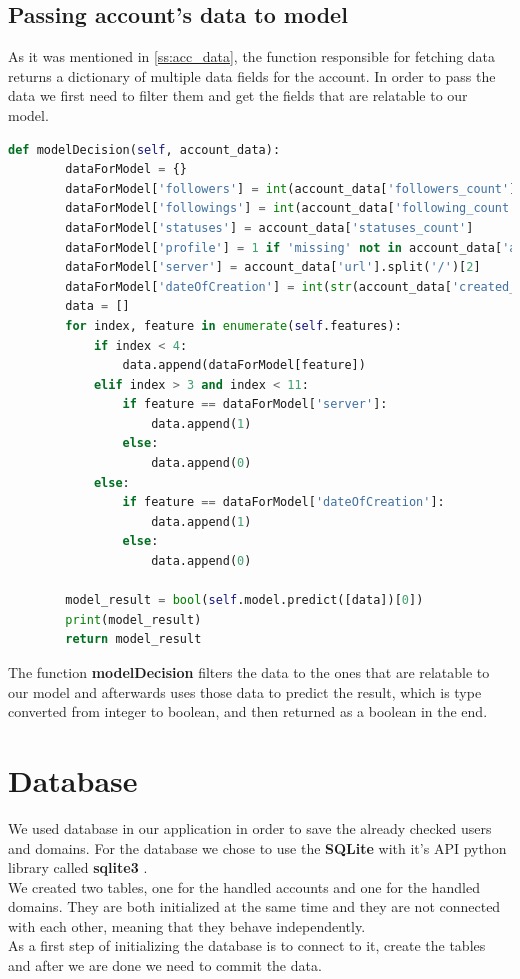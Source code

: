 \subsection{Passing account's data to model}
As it was mentioned in \ref{ss:acc_data}, the function responsible for fetching data returns a dictionary of
multiple data fields for the account. In order to pass the data we first need to filter them and get the fields
that are relatable to our model. 
\\[5pt]
\begin{lstlisting}[language=python, caption={Function that returns the model decision}, captionpos=b]
	def modelDecision(self, account_data):
		dataForModel = {}
		dataForModel['followers'] = int(account_data['followers_count'])
		dataForModel['followings'] = int(account_data['following_count'])
		dataForModel['statuses'] = account_data['statuses_count']
		dataForModel['profile'] = 1 if 'missing' not in account_data['avatar'].split('/') else 0
		dataForModel['server'] = account_data['url'].split('/')[2]
		dataForModel['dateOfCreation'] = int(str(account_data['created_at']).split('-')[0])
		data = []
		for index, feature in enumerate(self.features):
			if index < 4:
				data.append(dataForModel[feature])
			elif index > 3 and index < 11:
				if feature == dataForModel['server']:
					data.append(1)
				else:
					data.append(0)
			else:
				if feature == dataForModel['dateOfCreation']:
					data.append(1)
				else:
					data.append(0)
	
		model_result = bool(self.model.predict([data])[0])
		print(model_result)
		return model_result
\end{lstlisting}
The function \textbf{modelDecision} filters the data to the ones that are relatable to our model and
afterwards uses those data to predict the result, which is type converted from integer to boolean, and then
returned as a boolean in the end.
\section{Database}
We used database in our application in order to save the already checked users and domains. For the database
we chose to use the \textbf{SQLite} \cite{sqlite} with it's API python library called \textbf{sqlite3} \cite{sqllite3}.
\\[5pt]
We created two tables, one for the handled accounts and one for the handled domains. They are both initialized at the same time
and they are not connected with each other, meaning that they behave independently.
\\[5pt]
As a first step of initializing the database is to connect to it, create the tables and after we are done we need to commit the data.
